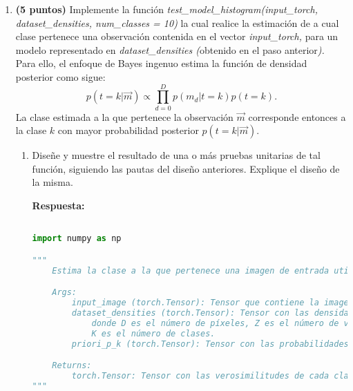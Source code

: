 \documentclass[spanish]{article}
\begin{document}
\begin{enumerate}
\begin{enumerate}
\begin{enumerate}
\begin{enumerate}
\begin{lstlisting}[language=Python, caption=Calculo a priori]
\end{lstlisting}

\begin{lstlisting}[language=Python, caption=Calculo a priori]
\end{lstlisting}

\begin{lstlisting}[language=Python, caption=Calculo a priori]
\end{lstlisting}
\item \textbf{(5 puntos)} Implemente la función \emph{test\_model\_histogram(input\_torch,
dataset\_densities, num\_classes = 10) }la cual realice la estimación
de a cual clase pertenece una observación contenida en el vector \emph{input\_torch,
}para un modelo representado en \emph{dataset\_densities (}obtenido
en el paso anterior\emph{). }Para ello, el enfoque de Bayes ingenuo
estima la función de densidad posterior como sigue:
\[
p\left(t=k|\overrightarrow{m}\right)\propto\prod_{d=0}^{D}p\left(m_{d}|t=k\right)p\left(t=k\right).
\]
La clase estimada a la que pertenece la observación $\overrightarrow{m}$
corresponde entonces a la clase $k$ con mayor probabilidad posterior
$p\left(t=k|\overrightarrow{m}\right)$. 
\begin{enumerate}
\item Diseñe y muestre el resultado de una o más pruebas unitarias de tal
función, siguiendo las pautas del diseño anteriores. Explique el diseño
de la misma. 

\vspace{15px}
\par \textbf{Respuesta:}
\begin{lstlisting}[language=Python, caption=Implementacion Test Model]

import numpy as np

"""
    Estima la clase a la que pertenece una imagen de entrada utilizando el modelo de histogramas.

    Args:
        input_image (torch.Tensor): Tensor que contiene la imagen de entrada.
        dataset_densities (torch.Tensor): Tensor con las densidades de los píxeles para cada clase, de forma [D, Z, K],
            donde D es el número de píxeles, Z es el número de valores de intensidad (256 para escala de grises) y
            K es el número de clases.
        priori_p_k (torch.Tensor): Tensor con las probabilidades a priori de cada clase.

    Returns:
        torch.Tensor: Tensor con las verosimilitudes de cada clase para la imagen de entrada.
"""


\end{lstlisting}
\end{enumerate}
\end{enumerate}
\end{enumerate}
\end{enumerate}
\end{enumerate}
\end{document}
